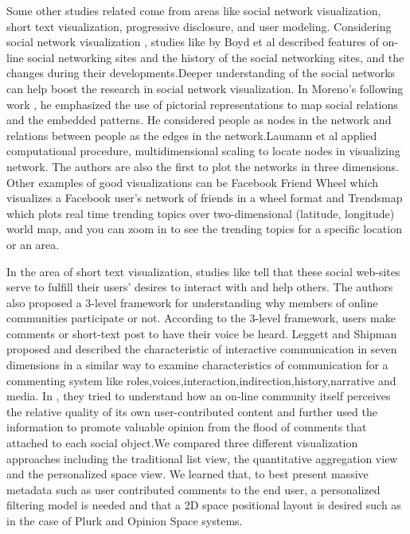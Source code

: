 \documentclass{sig-alternate}
\begin{document}
Some other studies related come from areas like social network visualization,
short text visualization, progressive disclosure, and user modeling. Considering
social network visualization , studies like \cite{Boyd:2008} by Boyd et al described features
of on-line social networking sites and the history of the social networking sites,
and the changes during their developments.Deeper understanding of the social
networks can help boost the research in social network visualization. In Moreno's
following work \cite{Moreno:1953}, he emphasized the use of pictorial representations to map
social relations and the embedded patterns. He considered people as nodes in the
network and relations between people as the edges in the network.Laumann et al
\cite{Laumann:1966} applied computational procedure, multidimensional scaling to locate nodes in
visualizing network. The authors are also the first to plot the networks in three
dimensions. Other examples of good visualizations can be Facebook Friend Wheel
\cite{facebook_wheel} which visualizes a Facebook user's network of friends in a wheel format and
Trendsmap \cite{trends_map} which plots real time trending topics over two-dimensional (latitude,
longitude) world map, and you can zoom in to see the trending topics for a specific
location or an area. 

In the area of short text visualization, studies like \cite{Bishop:2007} tell that these social
web-sites serve to fulfill their users' desires to interact with and help others.
The authors also proposed a 3-level framework for understanding why members of online
communities participate or not. According to the 3-level framework, users make
comments or short-text post to have their voice be heard. Leggett and Shipman \cite{Leggett:04} 
proposed and described the characteristic of interactive communication in seven
dimensions in a similar way to examine characteristics of communication for a
commenting system like roles,voices,interaction,indirection,history,narrative
and media. In \cite{Hsu:09}, they tried to understand how an on-line community itself
perceives the relative quality of its own user-contributed content and further
used the information to promote valuable opinion from the flood of comments
that attached to each social object.We compared three different visualization
approaches including the traditional list view, the quantitative aggregation
view and the personalized space view. We learned that, to best present massive
metadata such as user contributed comments to the end user, a personalized
filtering model is needed and that a 2D space positional layout is desired
such as in the case of Plurk and Opinion Space systems.
\end{document}
